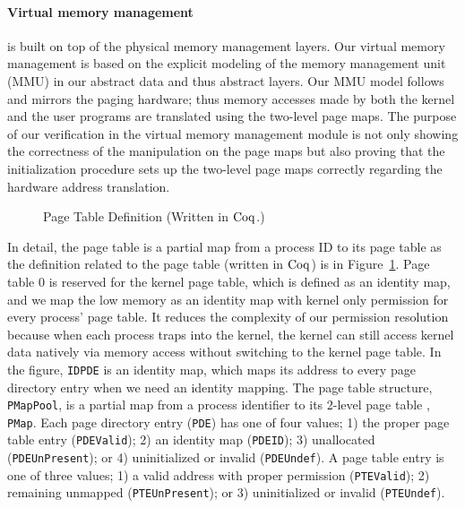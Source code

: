 \paragraph{Virtual memory management}
is built on top of the physical memory management layers. 
Our virtual memory management is
based on the explicit modeling of the memory management unit (MMU) in our abstract data and thus abstract layers. 
Our MMU model follows and mirrors the paging hardware; thus memory accesses made by both the kernel and the user programs are translated using the two-level page maps. 
The purpose of our verification in the virtual memory management module is
not only showing the correctness of the manipulation on the page maps but also proving 
that the initialization procedure sets up the two-level page maps correctly regarding the hardware address translation.

\begin{figure}
 
\caption{Page Table Definition (Written in $\mathrm{Coq}$.)}
\label{fig:chapter:certikos:page-table}
\end{figure}
In detail, the page table is a partial map from a process ID to its page table as the definition related to the page table (written in $\mathrm{Coq}$) is in
Figure~\ref{fig:chapter:certikos:page-table}. 
Page table 0 is reserved for the kernel page table, which is defined as an identity map,
and we map the low memory as an identity map with kernel only permission
for every process' page table.
It reduces the complexity of our permission resolution because when each process traps into the kernel,
the kernel can still access kernel data natively via memory access
without switching to the kernel page table. 
In the figure, 
\lstinline$IDPDE$ is an identity  map, which maps its address to every page directory entry when we need an identity mapping.
The page table structure, \lstinline$PMapPool$, is a partial map from a process identifier to its 2-level page table , \lstinline$PMap$.
 Each page directory entry (\lstinline$PDE$) has one of four values;
 1) the proper page table entry (\lstinline$PDEValid$); 2) an identity map (\lstinline$PDEID$); 3) unallocated (\lstinline$PDEUnPresent$); or 4) uninitialized or invalid (\lstinline$PDEUndef$). 
A page table entry is one of three values;
1)  a valid address with proper permission (\lstinline$PTEValid$); 2) remaining unmapped (\lstinline$PTEUnPresent$);
 or 3) uninitialized or invalid (\lstinline$PTEUndef$).

